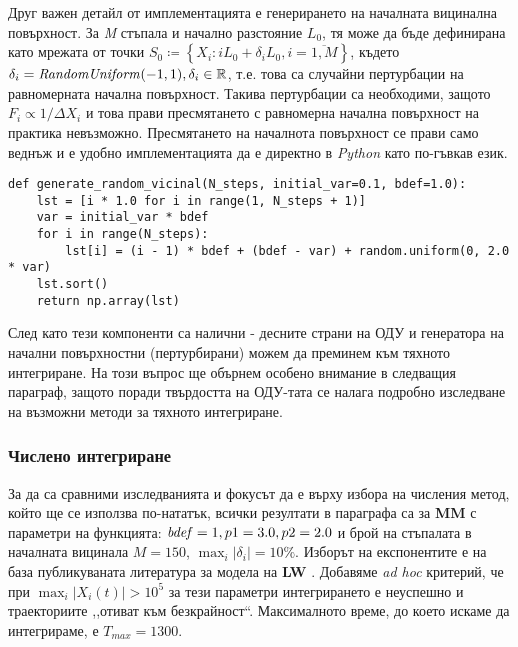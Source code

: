 Друг важен детайл от имплементацията е генерирането на началната вицинална повърхност. За \textit{M} стъпала и начално разстояние $L_0$, тя може да бъде дефинирана като мрежата от точки $S_0 \coloneqq \left\{ X_i: i L_0 + \delta_{i} L_0, i = \overline{1, M} \right\}$, където $\delta_i = \text{\textit{RandomUniform}}(-1,1), \delta_{i} \in \mathbb{R}$, т.е. това са случайни пертурбации на равномерната начална повърхност. Такива пертурбации са необходими, защото $F_i \propto 1/\Delta X_i$ и това прави пресмятането с равномерна начална повърхност на практика невъзможно. Пресмятането на началнота повърхност се прави само веднъж и е удобно имплементацията да е директно в \textit{Python} като по-гъвкав език.
\begin{verbatim}
def generate_random_vicinal(N_steps, initial_var=0.1, bdef=1.0):
    lst = [i * 1.0 for i in range(1, N_steps + 1)]
    var = initial_var * bdef
    for i in range(N_steps):
        lst[i] = (i - 1) * bdef + (bdef - var) + random.uniform(0, 2.0 * var)
    lst.sort()
    return np.array(lst)
\end{verbatim}

След като тези компоненти са налични - десните страни на ОДУ и генератора на начални повърхностни (пертурбирани) можем да преминем към тяхното интегриране. На този въпрос ще обърнем особено внимание в следващия параграф, защото поради твърдостта на ОДУ-тата се налага подробно изследване на възможни методи за тяхното интегриране.

\subsubsection{Числено интегриране}
За да са сравними изследванията и фокусът да е върху избора на числения метод, който ще се използва по-нататък, всички резултати в параграфа са за \textbf{MM} с параметри на функцията: $\text{\textit{bdef}} = 1, p1 = 3.0, p2 = 2.0$ и брой на стъпалата в началната вицинала $M = 150$, $\max_i |\delta_i| = 10\%$. Изборът на експонентите е на база публикуваната литература за модела на \textbf{LW} \cite{Liu1998}. Добавяме \textit{ad hoc} критерий, че при $\max_{i} |X_i(t)| > 10^{5}$ за тези параметри интегрирането е неуспешно и траекториите ,,отиват към безкрайност``. Максималното време, до което искаме да интегрираме, е $T_{max} = 1300$.

